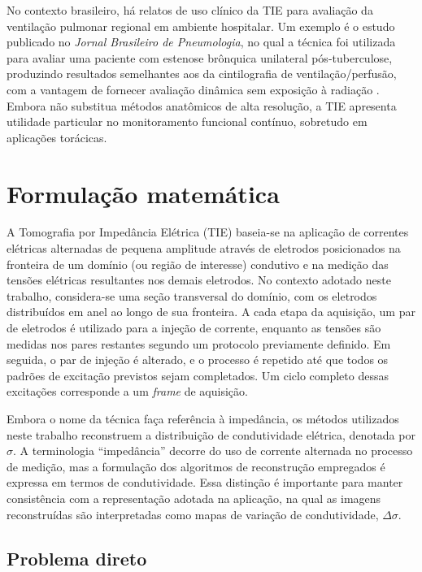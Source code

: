 No contexto brasileiro, há relatos de uso clínico da TIE para avaliação da ventilação pulmonar regional em ambiente hospitalar. Um exemplo é o estudo publicado no \textit{Jornal Brasileiro de Pneumologia}, no qual a técnica foi utilizada para avaliar uma paciente com estenose brônquica unilateral pós-tuberculose, produzindo resultados semelhantes aos da cintilografia de ventilação/perfusão, com a vantagem de fornecer avaliação dinâmica sem exposição à radiação \cite{Marinho2013JBP}. Embora não substitua métodos anatômicos de alta resolução, a TIE apresenta utilidade particular no monitoramento funcional contínuo, sobretudo em aplicações torácicas.

\section{Formulação matemática}
\label{sec:fundamentos_tie}

A Tomografia por Impedância Elétrica (TIE) baseia-se na aplicação de correntes elétricas alternadas de pequena amplitude através de eletrodos posicionados na fronteira de um domínio (ou região de interesse) condutivo e na medição das tensões elétricas resultantes nos demais eletrodos. No contexto adotado neste trabalho, considera-se uma seção transversal do domínio, com os eletrodos distribuídos em anel ao longo de sua fronteira. A cada etapa da aquisição, um par de eletrodos é utilizado para a injeção de corrente, enquanto as tensões são medidas nos pares restantes segundo um protocolo previamente definido. Em seguida, o par de injeção é alterado, e o processo é repetido até que todos os padrões de excitação previstos sejam completados. Um ciclo completo dessas excitações corresponde a um \textit{frame} de aquisição.

Embora o nome da técnica faça referência à impedância, os métodos utilizados neste trabalho reconstruem a distribuição de condutividade elétrica, denotada por \(\sigma\). A terminologia ``impedância'' decorre do uso de corrente alternada no processo de medição, mas a formulação dos algoritmos de reconstrução empregados é expressa em termos de condutividade. Essa distinção é importante para manter consistência com a representação adotada na aplicação, na qual as imagens reconstruídas são interpretadas como mapas de variação de condutividade, \(\Delta \sigma\).

\subsection{Problema direto}
\label{subsec:problema_direto}

